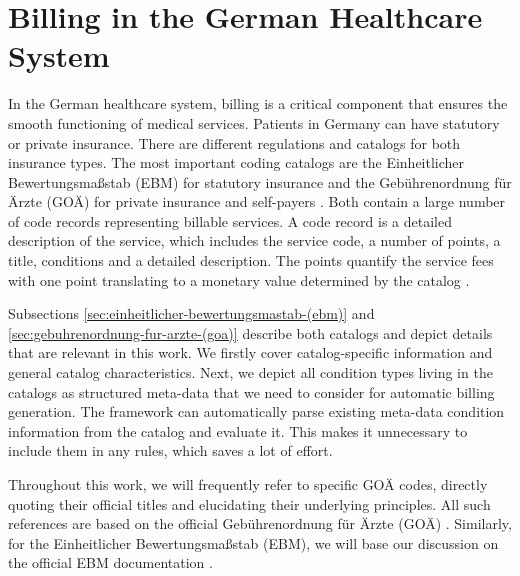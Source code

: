 \chapter{Billing in the German Healthcare System}\label{ch:billing-in-the-german-healthcare-system}

In the German healthcare system, billing is a critical component that ensures the smooth functioning of medical services.
Patients in Germany can have statutory or private insurance.
There are different regulations and catalogs for both insurance types.
The most important coding catalogs are the Einheitlicher Bewertungsmaßstab (EBM) for statutory insurance and the Gebührenordnung für Ärzte (GOÄ) for private insurance and self-payers \cite{Stausberg1998}.
Both contain a large number of code records representing billable services.
A code record is a detailed description of the service, which includes the service code, a number of points, a title, conditions and a detailed description.
The points quantify the service fees with one point translating to a monetary value determined by the catalog \cite{Stausberg1998}.

Subsections \ref{sec:einheitlicher-bewertungsmastab-(ebm)} and \ref{sec:gebuhrenordnung-fur-arzte-(goa)} describe both catalogs and depict details that are relevant in this work.
We firstly cover catalog-specific information and general catalog characteristics.
Next, we depict all condition types living in the catalogs as structured meta-data that we need to consider for automatic billing generation.
The framework can automatically parse existing meta-data condition information from the catalog and evaluate it.
This makes it unnecessary to include them in any rules, which saves a lot of effort.

Throughout this work, we will frequently refer to specific GOÄ codes, directly quoting their official titles and elucidating their underlying principles.
All such references are based on the official Gebührenordnung für Ärzte (GOÄ) \cite{bruck1998kommentar}.
Similarly, for the Einheitlicher Bewertungsmaßstab (EBM), we will base our discussion on the official EBM documentation \cite{hermanns2015ebm}.



